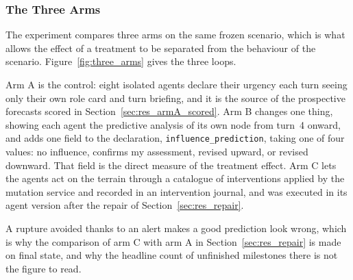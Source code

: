 
\subsubsection{The Three Arms}
\label{sec:methods_arms}

The experiment compares three arms on the same frozen scenario, which is what allows the
effect of a treatment to be separated from the behaviour of the scenario.
Figure~\ref{fig:three_arms} gives the three loops.

Arm A is the control: eight isolated agents declare their urgency each turn seeing only their
own role card and turn briefing, and it is the source of the prospective forecasts scored in
Section~\ref{sec:res_armA_scored}. Arm B changes one thing, showing each agent the predictive
analysis of its own node from turn~4 onward, and adds one field to the declaration,
\texttt{influence\_prediction}, taking one of four values: no influence, confirms my
assessment, revised upward, or revised downward. That field is the direct measure of the
treatment effect. Arm C lets the agents act on the terrain through a catalogue of
interventions applied by the mutation service and recorded in an intervention journal, and was
executed in its agent version after the repair of Section~\ref{sec:res_repair}.

A rupture avoided thanks to an alert makes a good prediction look wrong, which is why the
comparison of arm C with arm A in Section~\ref{sec:res_repair} is made on final state, and why
the headline count of unfinished milestones there is not the figure to read.


